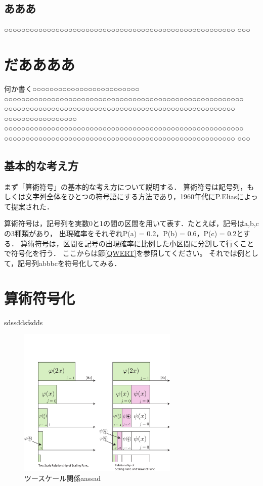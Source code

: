 \subsection{あああ} ○○○○○○○○○○○○○○○○○○○○○○○○○○○○○○○○○○○○○○○○○○○○○○○○○○○○○○ ○○○
\section{だああああ}
何か書く○○○○○○○○○○○○○○○○○○○○○○○○○ ○○○○○○○○○○○○○○○○○○○○○○○○○○○○○○○○○○○○○○○○○○○○○○○○○○○○○○○○ ○○○○○○○○○○○○○○○○○○○○○○○○○○○○○○○○○○○○○○○○○○○○○○○○○○○○○○ ○○○○○○○○○○○○○○○○○ ○○○○○○○○○○○○○○○○○○○○○○○○○○○○○○○○○○○○○○○○○○○○○○○○○○○○○○○○ ○○○○○○○○○○○○○○○○○○○○○○○○○○○○○○○○○○○○○○○○○○○○○○○○○○○○○○ ○○○


\subsection{基本的な考え方}
まず「算術符号」の{\gt 基本的な考え方について説明}する\cite{wavelet-2}．
算術符号は記号列，もしくは{\huge 文字列全体を\gt ひとつの符号語に}する方法であり，1960年代にP.Eliasによって提案された．\par
算術符号は，記号列を実数0と1の間の区間を用いて表す．たとえば，記号は{a,b,c}の3種類があり，
出現確率をそれぞれP(a) = 0.2，P(b) = 0.6，P(c) = 0.2とする．
算術符号は，区間を記号の出現確率に比例した小区間に分割して行くことで符号化を行う．
ここからは節\ref{QWERT}を参照してください。
それでは例として，記号列abbbcを符号化してみる．


\section{算術符号化}
sdssddsfsdds





\begin{figure}[htbp]
\begin{center}
\includegraphics[width=3in]{chap1/fig/two-scale.pdf}
\caption{ツースケール関係aassad} \label{fig-two-scale.pdf}
\end{center}
\end{figure}

